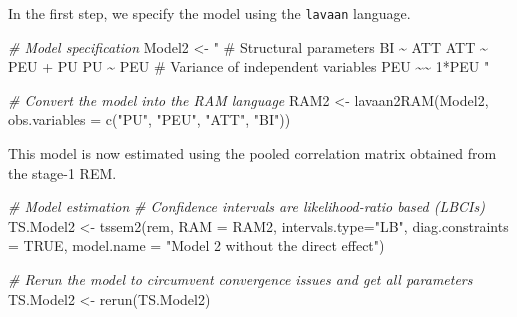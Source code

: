 \documentclass[
]{book}
\newenvironment{Shaded}{\begin{snugshade}}{\end{snugshade}}
\newcommand{\AttributeTok}[1]{\textcolor[rgb]{0.77,0.63,0.00}{#1}}
\newcommand{\CommentTok}[1]{\textcolor[rgb]{0.56,0.35,0.01}{\textit{#1}}}
\newcommand{\ConstantTok}[1]{\textcolor[rgb]{0.00,0.00,0.00}{#1}}
\newcommand{\FunctionTok}[1]{\textcolor[rgb]{0.00,0.00,0.00}{#1}}
\newcommand{\NormalTok}[1]{#1}
\newcommand{\OtherTok}[1]{\textcolor[rgb]{0.56,0.35,0.01}{#1}}
\newcommand{\StringTok}[1]{\textcolor[rgb]{0.31,0.60,0.02}{#1}}
\begin{document}
In the first step, we specify the model using the \texttt{lavaan} language.

\begin{Shaded}
\begin{Highlighting}[]
\CommentTok{\# Model specification}
\NormalTok{Model2 }\OtherTok{\textless{}{-}} \StringTok{" \# Structural parameters}
\StringTok{            BI \textasciitilde{} ATT}
\StringTok{            ATT \textasciitilde{} PEU + PU}
\StringTok{            PU \textasciitilde{} PEU}
\StringTok{            }
\StringTok{            \# Variance of independent variables}
\StringTok{            PEU \textasciitilde{}\textasciitilde{} 1*PEU}
\StringTok{"}

\CommentTok{\# Convert the model into the RAM language}
\NormalTok{RAM2 }\OtherTok{\textless{}{-}} \FunctionTok{lavaan2RAM}\NormalTok{(Model2,}
                  \AttributeTok{obs.variables =} \FunctionTok{c}\NormalTok{(}\StringTok{"PU"}\NormalTok{, }\StringTok{"PEU"}\NormalTok{, }\StringTok{"ATT"}\NormalTok{, }\StringTok{"BI"}\NormalTok{))}
\end{Highlighting}
\end{Shaded}

This model is now estimated using the pooled correlation matrix obtained from the stage-1 REM.

\begin{Shaded}
\begin{Highlighting}[]
\CommentTok{\# Model estimation}
\CommentTok{\# Confidence intervals are likelihood{-}ratio based (LBCIs)}
\NormalTok{TS.Model2 }\OtherTok{\textless{}{-}} \FunctionTok{tssem2}\NormalTok{(rem, }\AttributeTok{RAM =}\NormalTok{ RAM2,}
                  \AttributeTok{intervals.type=}\StringTok{"LB"}\NormalTok{,}
                  \AttributeTok{diag.constraints =} \ConstantTok{TRUE}\NormalTok{,}
                  \AttributeTok{model.name =} \StringTok{"Model 2 without the direct effect"}\NormalTok{)}

\CommentTok{\# Rerun the model to circumvent convergence issues and get all parameters}
\NormalTok{TS.Model2 }\OtherTok{\textless{}{-}} \FunctionTok{rerun}\NormalTok{(TS.Model2)}
\end{Highlighting}
\end{Shaded}
\end{document}
